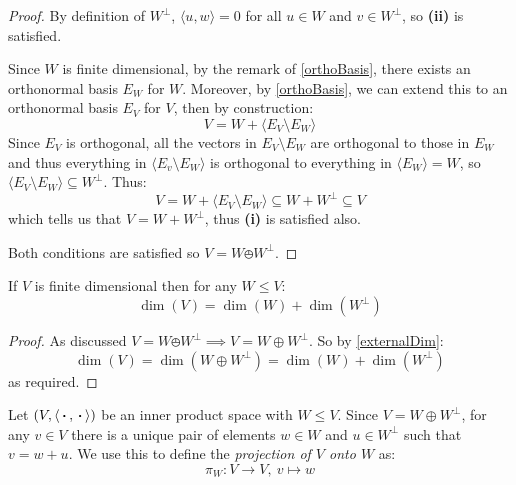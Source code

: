\documentclass[../main.tex]{subfiles}
\begin{document}
\begin{proof}
  By definition of $W^{\perp}$, $\langle u, w \rangle = 0$ for all $u \in W$ and $v \in W^{\perp}$, so \textbf{(ii)} is satisfied.

  Since $W$ is finite dimensional, by the remark of \cref{orthoBasis}, there exists an orthonormal basis $E_W$ for $W$.
  Moreover, by \cref{orthoBasis}, we can extend this to an orthonormal basis $E_V$ for $V$, then by construction:
  \[
    V = W + \langle E_V \setminus E_W \rangle
  \]
  Since $E_V$ is orthogonal, all the vectors in $E_V \setminus E_W$ are orthogonal to those in $E_W$ and thus everything in $\langle E_v \setminus E_W \rangle$ is orthogonal to everything in $\langle E_W \rangle = W$, so $\langle E_V \setminus E_W \rangle \subseteq W^{\perp}$.
  Thus:
  \[
    V = W + \langle E_V \setminus E_W \rangle \subseteq W + W^{\perp} \subseteq V
  \]
  which tells us that $V = W + W^{\perp}$, thus \textbf{(i)} is satisfied also.

  Both conditions are satisfied so $V = W \obot W^{\perp}$.
\end{proof}
\begin{corollary}
  If $V$ is finite dimensional then for any $W \leq V$:
  \[
    \dim(V) = \dim(W) + \dim(W^{\perp})
  \]
\end{corollary}
\begin{proof}
  As discussed $V = W \obot W^{\perp} \implies V = W \oplus W^{\perp}$.
  So by \cref{externalDim}:
  \[
    \dim(V) = \dim(W \oplus W^{\perp}) = \dim(W) + \dim(W^{\perp})
  \]
  as required.
\end{proof}
\begin{definition}
  Let $(V, \langle {\hspace{0.18em}\boldsymbol{\cdot}\hspace{0.18em}}, {\hspace{0.18em}\boldsymbol{\cdot}\hspace{0.18em}} \rangle)$ be an inner product space with $W \leq V$.
  Since $V = W \oplus W^{\perp}$, for any $v \in V$ there is a unique pair of elements $w \in W$ and $u \in W^{\perp}$ such that $v = w + u$.
  We use this to define the \textit{projection of $V$ onto $W$} as:
  \[
    \pi_W: V \to V,\ v \mapsto w
  \]
\end{definition}
\end{document}
